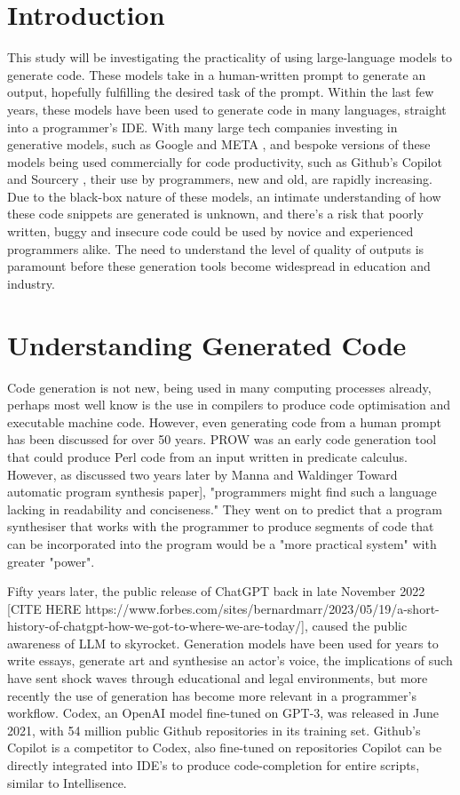 \documentclass[manuscript,screen,review,sigconf]{acmart}
\begin{document}
\section{Introduction}
This study will be investigating the practicality of using large-language models to generate code. These models take in a human-written prompt to generate an output, hopefully fulfilling the desired task of the prompt. Within the last few years, these models have been used to generate code in many languages, straight into a programmer's IDE. With many large tech companies investing in generative models, such as Google and META \cite{Google_AI_2023, Meta_2023}, and bespoke versions of these models being used commercially for code productivity, such as Github's Copilot and Sourcery \cite{GitHub_2021, Sourcery_2023}, their use by programmers, new and old, are rapidly increasing. Due to the black-box nature of these models, an intimate understanding of how these code snippets are generated is unknown, and there's a risk that poorly written, buggy and insecure code could be used by novice and experienced programmers alike. The need to understand the level of quality of outputs is paramount before these generation tools become widespread in education and industry.

\section{Understanding Generated Code}
Code generation is not new, being used in many computing processes already, perhaps most well know is the use in compilers to produce code optimisation and executable machine code. However, even generating code from a human prompt has been discussed for over 50 years. PROW \cite{PROW} was an early code generation tool that could produce Perl code from an input written in predicate calculus. However, as discussed two years later by Manna and Waldinger \cite{Program_Syn} Toward automatic program synthesis paper], "programmers might find such a language lacking in readability and conciseness." They went on to predict that a program synthesiser that works with the programmer to produce segments of code that can be incorporated into the program would be a "more practical system" with greater "power".

Fifty years later, the public release of ChatGPT back in late November 2022 [CITE HERE https://www.forbes.com/sites/bernardmarr/2023/05/19/a-short-history-of-chatgpt-how-we-got-to-where-we-are-today/], caused the public awareness of LLM  to skyrocket. Generation models have been used for years to write essays, generate art and synthesise an actor's voice, the implications of such have sent shock waves through educational and legal environments, but more recently the use of generation has become more relevant in a programmer's workflow. Codex, an OpenAI model fine-tuned on GPT-3, was released in June 2021, with 54 million public Github repositories in its training set\cite{CodexRelPaper}. Github's Copilot is a competitor to Codex, also fine-tuned on repositories Copilot can be directly integrated into IDE's to produce code-completion for entire scripts, similar to Intellisence.
\end{document}
